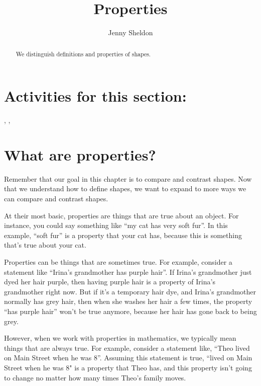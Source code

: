 \documentclass{ximera}
\title{Properties}
\author{Jenny Sheldon}
\begin{document}
\begin{abstract}
We distinguish definitions and properties of shapes.
\end{abstract}
\maketitle


\section{Activities for this section:} 
, 
, 



\section{What are properties?}

Remember that our goal in this chapter is to compare and contrast shapes. Now that we understand how to define shapes, we want to expand to more ways we can compare and contrast shapes.

At their most basic, properties are things that are true about an object. For instance, you could say something like ``my cat has very soft fur''. In this example, ``soft fur'' is a property that your cat has, because this is something that's true about your cat. 

Properties can be things that are sometimes true. For example, consider a statement like ``Irina's grandmother has purple hair''. If Irina's grandmother just dyed her hair purple, then having purple hair is a property of Irina's grandmother right now. But if it's a temporary hair dye, and Irina's grandmother normally has grey hair, then when she washes her hair a few times, the property ``has purple hair'' won't be true anymore, because her hair has gone back to being grey.

However, when we work with properties in mathematics, we typically mean things that are always true. For example, consider a statement like, ``Theo lived on Main Street when he was 8''. Assuming this statement is true, ``lived on Main Street when he was 8" is a property that Theo has, and this property isn't going to change no matter how many times Theo's family moves.
\end{document}
